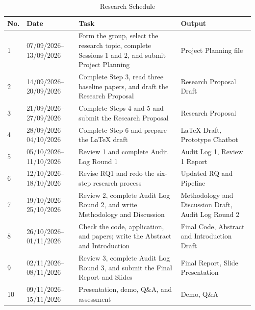 \documentclass[pdflatex,sn-mathphys-num]{sn-jnl}
\theoremstyle{thmstyleone}
\theoremstyle{thmstyletwo}
\theoremstyle{thmstylethree}
\begin{document}
\begin{table}[htbp]
\centering
\caption{Research Schedule}
\label{tab:researchplan}
\small
\setlength{\tabcolsep}{4pt}
\begin{tabular}{p{}p{}p{}p{}}
\toprule
No. & Date & Task & Output \\
\midrule

1 &
07/09/2026--13/09/2026 &
Form the group, select the research topic, complete Sessions 1 and 2,
and submit Project Planning &
Project Planning file \\

2 &
14/09/2026--20/09/2026 &
Complete Step 3, read three baseline papers, and draft the Research Proposal &
Research Proposal Draft \\

3 &
21/09/2026--27/09/2026 &
Complete Steps 4 and 5 and submit the Research Proposal &
Research Proposal \\

4 &
28/09/2026--04/10/2026 &
Complete Step 6 and prepare the LaTeX draft &
LaTeX Draft, Prototype Chatbot \\

5 &
05/10/2026--11/10/2026 &
Review 1 and complete Audit Log Round 1 &
Audit Log 1, Review 1 Report \\

6 &
12/10/2026--18/10/2026 &
Revise RQ1 and redo the six-step research process &
Updated RQ and Pipeline \\

7 &
19/10/2026--25/10/2026 &
Review 2, complete Audit Log Round 2, and write Methodology and Discussion &
Methodology and Discussion Draft, Audit Log Round 2 \\

8 &
26/10/2026--01/11/2026 &
Check the code, application, and papers; write the Abstract and Introduction &
Final Code, Abstract and Introduction Draft \\

9 &
02/11/2026--08/11/2026 &
Review 3, complete Audit Log Round 3, and submit the Final Report and Slides &
Final Report, Slide Presentation \\

10 &
09/11/2026--15/11/2026 &
Presentation, demo, Q\&A, and assessment &
Demo, Q\&A \\

\bottomrule
\end{tabular}
\end{table}
\end{document}
